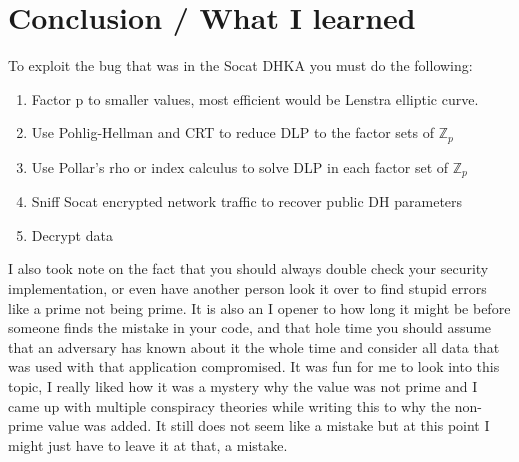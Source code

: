 \documentclass[letterpaper,11pt,notitlepage,fleqn]{article}
\begin{document}
\section{Conclusion / What I learned}
\noindent To exploit the bug that was in the Socat DHKA you must do the following:
\begin{enumerate}
    \item Factor p to smaller values, most efficient would be Lenstra elliptic curve.
    \item Use Pohlig-Hellman and CRT to reduce DLP to the factor sets of $\mathbb{Z}_{p}$
    \item Use Pollar's rho or index calculus to solve DLP in each factor set of $\mathbb{Z}_{p}$
    \item Sniff Socat encrypted network traffic to recover public DH parameters
    \item Decrypt data
\end{enumerate}
\indent I also took note on the fact that you should always double check your security implementation, or even have another person look it over to find stupid errors like a prime not being prime. It is also an I opener to how long it might be before someone finds the mistake in your code, and that hole time you should assume that an adversary has known about it the whole time and consider all data that was used with that application compromised.  It was fun for me to look into
this topic, I really liked how it was a mystery why the value was not prime and I came up with multiple conspiracy theories while writing this to why the non-prime value was added. It still does not seem like a mistake but at this point I might just have to leave it at that, a mistake.

\medskip
 


\end{document}
